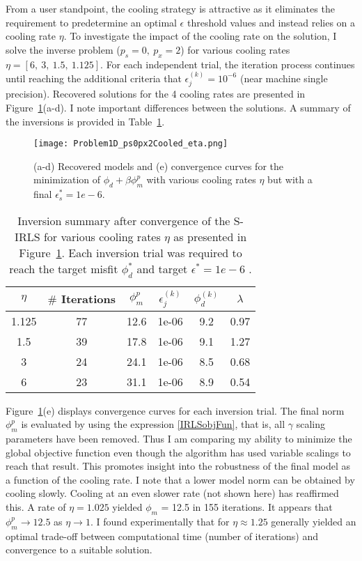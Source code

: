 From a user standpoint, the cooling strategy is attractive as it eliminates the requirement to predetermine an optimal $\epsilon$ threshold values and instead relies on a cooling rate $\eta$.
To investigate the impact of the cooling rate on the solution, I solve the inverse problem ($p_s=0,\: p_x=2$) for various cooling rates $\eta=[6,\:3,\:1.5,\:1.125]$.
For each independent trial, the iteration process continues until reaching the additional criteria that $\epsilon_j^{(k)} = 10^{-6}$ (near machine single precision).
Recovered solutions for the 4 cooling rates are presented in Figure~\ref{Mixed1DCooledEta}(a-d). I note important differences between the solutions. A summary of the inversions is provided in Table~\ref{table:Cooling}.
\begin{figure}
\texttt{[image: Problem1D\_ps0px2Cooled\_eta.png]}
\caption{(a-d) Recovered models and (e) convergence curves for the minimization of $\phi_d +\beta \phi_m^p$ with various cooling rates $\eta$ but with a final $\epsilon_s^* = 1e-6$.
}
\label{Mixed1DCooledEta}
\end{figure}
\begin{table}
\centering
\begin{tabular}{| c | c | c | c | c | c |} \hline
$\eta$ & $\#$ Iterations &$\phi_m^{p} $& $\epsilon_j^{(k)}$ & $\phi_d^{(k)}$ & $\lambda$ \\ \hline
1.125 	& 77	& 12.6 & 1e-06& 9.2& 0.97\\
1.5 		&39		& 17.8 & 1e-06& 9.1& 1.27\\
3 		&24		& 24.1 & 1e-06& 8.5& 0.68\\
6 		&23		& 31.1 & 1e-06& 8.9& 0.54\\ \hline
\end{tabular}
\caption{Inversion summary after convergence of the S-IRLS for various cooling rates $\eta$ as presented in Figure~\ref{Mixed1DCooledEta}. Each inversion trial was required to reach the target misfit $\phi_d^*$ and target $\epsilon^* =
1e-6$ .}
\label{table:Cooling}
\end{table}

Figure~\ref{Mixed1DCooledEta}(e) displays convergence curves for each inversion trial. The final norm $\phi_m^p$ is evaluated by using the expression \eqref{IRLSobjFun}, that is, all $\gamma$ scaling parameters have been removed. Thus I am comparing my ability to minimize the global objective function even though the algorithm has used variable scalings to reach that result. This promotes insight into the robustness of the final model as a function of the cooling rate.
I note that a lower model norm can be obtained by cooling slowly. Cooling at an even slower rate (not shown here) has reaffirmed this. A rate of $\eta=1.025$ yielded $\phi_m$ = 12.5 in 155 iterations. It appears that $\phi_m^p \rightarrow 12.5$ as $\eta \rightarrow 1$.
I found experimentally that for $\eta \approx 1.25$ generally yielded an optimal trade-off between computational time (number of iterations) and convergence to a suitable solution.

